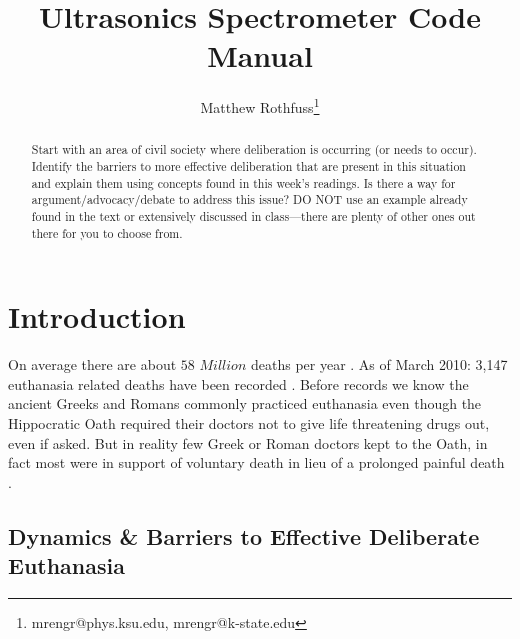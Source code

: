 \documentclass[journal]{IEEEtran}
\begin{document}
\title{Ultrasonics Spectrometer Code Manual}
\author{Matthew Rothfuss\thanks{mrengr@phys.ksu.edu,  mrengr@k-state.edu}}


\maketitle

\begin{abstract}
Start with an area of civil society where deliberation is occurring (or needs to occur). Identify the barriers to more effective deliberation that are present in this situation and explain them using concepts found in this week's readings. Is there a way for argument/advocacy/debate to address this issue? DO NOT use an example already found in the text or extensively discussed in class---there are plenty of other ones out there for you to choose from.
\end{abstract}



\section{Introduction}

On average there are about $58$ $Million$ deaths per year \cite{gomez_alvarez-arenas_air-coupled_2003}. As of March 2010: 3,147 euthanasia related deaths have been recorded \cite{kulmyrzaev_characterization_2000}. Before records we know the ancient Greeks and Romans commonly practiced euthanasia even though the Hippocratic Oath required their doctors not to give life threatening drugs out, even if asked.  But in reality few Greek or Roman doctors kept to the Oath, in fact most were in support of voluntary death in lieu of a prolonged painful death \cite{meyer_characterization_2006}.

\subsection{Dynamics \& Barriers to Effective Deliberate Euthanasia}
\end{document}
